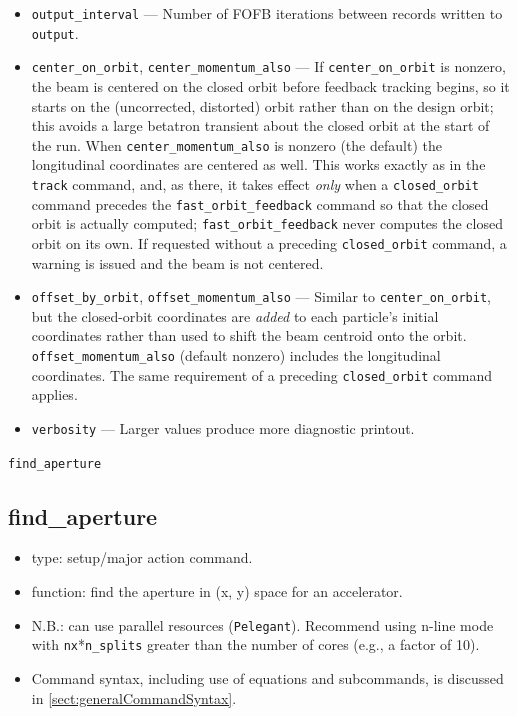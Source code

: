 \documentclass[11pt]{article}
\begin{document}
\begin{itemize}
  can be examined live while tracking is still in progress rather than only at the end.
\item \verb|output_interval| --- Number of FOFB iterations between records written to
  \verb|output|.
\item \verb|center_on_orbit|, \verb|center_momentum_also| --- If \verb|center_on_orbit| is
  nonzero, the beam is centered on the closed orbit before feedback tracking begins, so it
  starts on the (uncorrected, distorted) orbit rather than on the design orbit; this avoids
  a large betatron transient about the closed orbit at the start of the run.  When
  \verb|center_momentum_also| is nonzero (the default) the longitudinal coordinates are
  centered as well.  This works exactly as in the \verb|track| command, and, as there, it
  takes effect \emph{only} when a \verb|closed_orbit| command precedes the
  \verb|fast_orbit_feedback| command so that the closed orbit is actually computed;
  \verb|fast_orbit_feedback| never computes the closed orbit on its own.  If requested
  without a preceding \verb|closed_orbit| command, a warning is issued and the beam is not
  centered.
\item \verb|offset_by_orbit|, \verb|offset_momentum_also| --- Similar to
  \verb|center_on_orbit|, but the closed-orbit coordinates are \emph{added} to each
  particle's initial coordinates rather than used to shift the beam centroid onto the orbit.
  \verb|offset_momentum_also| (default nonzero) includes the longitudinal coordinates.  The
  same requirement of a preceding \verb|closed_orbit| command applies.
\item \verb|verbosity| --- Larger values produce more diagnostic printout.
\end{itemize}

\newpage
\begin{center}{\Large\verb|find_aperture|}\end{center}
\subsection{find\_aperture \label{subsec:findaperture}}

\begin{itemize}
\item type: setup/major action command.
\item function: find the aperture in (x, y) space for an accelerator.
\item N.B.: can use parallel resources (\verb|Pelegant|). Recommend using n-line mode with \verb|nx|*\verb|n_splits|
  greater than the number of cores (e.g., a factor of 10).
\item Command syntax, including use of equations and subcommands, is discussed in \ref{sect:generalCommandSyntax}.
\end{itemize}
\end{document}
